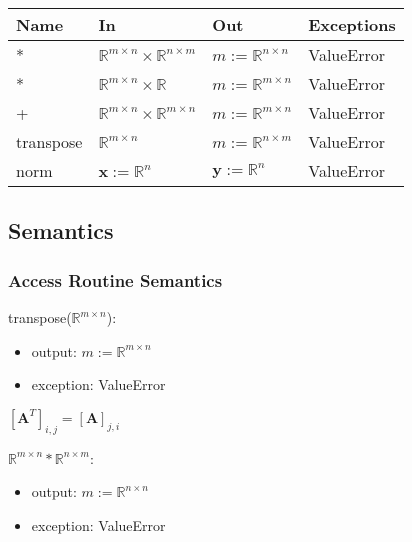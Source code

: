\documentclass[12pt, titlepage]{article}
\begin{document}
\begin{center}
\begin{tabular}{p{2cm} p{3cm} p{2.5cm} p{4.5cm}}
\hline
\textbf{Name} & \textbf{In} & \textbf{Out} & \textbf{Exceptions} \\
\hline
* & $\mathbb{R}^{m \times n} \times \mathbb{R}^{n \times m}$ & $m:=\mathbb{R}^{n \times n}$ &
ValueError \\
* & $\mathbb{R}^{m \times n} \times \mathbb{R}$ & $m:=\mathbb{R}^{m \times n}$ & ValueError \\
+ & $\mathbb{R}^{m \times n} \times \mathbb{R}^{m \times n}$ & $m:=\mathbb{R}^{m \times n}$ &
ValueError \\
transpose & $\mathbb{R}^{m \times n}$ & $m:=\mathbb{R}^{n \times m}$ & ValueError \\
norm & $\mathbf{x}:=\mathbb{R}^n$ & $\mathbf{y}:=\mathbb{R}^n$ & ValueError\\
\hline
\end{tabular}
\end{center}

\subsection{Semantics}

\subsubsection{Access Routine Semantics}

\noindent transpose($\mathbb{R}^{m \times n}$):
\begin{itemize}
\item output: $m:=\mathbb{R}^{m \times n}$
\item exception: ValueError
\end{itemize}

$[\mathbf{A}^T]_{i,j} = [\mathbf{A}]_{j,i}$
\newline

\noindent $\mathbb{R}^{m \times n} * \mathbb{R}^{n \times m}$:
\begin{itemize}
\item output: $m:=\mathbb{R}^{n \times n}$
\item exception: ValueError
\end{itemize}
\end{document}
